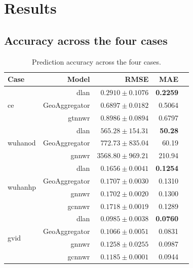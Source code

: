 \documentclass[]{interact}
\newcommand{\DLAN}{\gls{dlan}\xspace}
\newcommand{\GNNWR}{\gls{gnnwr}\xspace}
\newcommand{\GTNNWR}{\gls{gtnnwr}\xspace}
\newcommand{\GCNNWR}{\gls{gcnnwr}\xspace}
\newcommand{\GAgg}{GeoAggregator\xspace}
\newcommand{\COO}{\gls{ce}\xspace}
\newcommand{\WuhanOD}{\gls{wuhanod}\xspace}
\newcommand{\WuhanHP}{\gls{wuhanhp}\xspace}
\newcommand{\GVI}{\gls{gvid}\xspace}
\begin{document}
\section{Results}\label{sec:results}

\subsection{Accuracy across the four cases}

\begin{table}[tb]
  \centering\small
  \caption{Prediction accuracy across the four cases.}
  \label{tab:accuracy}
    \begin{tabular}{lrrrr}\toprule
    Case & Model   & RMSE                       & MAE             \\
    \midrule
    \multirow{3}{*}{\COO}
         & \DLAN   & $\mathbf{0.2910}\pm0.1076$ & \textbf{0.2259} \\
         & \GAgg   & $0.6897\pm0.0182$          & 0.5064          \\
         & \GTNNWR & $0.8986\pm0.0894$          & 0.6797          \\
    \midrule
    \multirow{3}{*}{\WuhanOD}
         & \DLAN   & $\mathbf{565.28}\pm154.31$ & \textbf{50.28}  \\
         & \GAgg   & $772.73\pm835.04$          & 60.19           \\
         & \GNNWR  & $3568.80\pm969.21$         & 210.94          \\
    \midrule
    \multirow{4}{*}{\WuhanHP}
         & \DLAN   & $\mathbf{0.1656}\pm0.0041$ & \textbf{0.1254} \\
         & \GAgg   & $0.1707\pm0.0030$          & 0.1310          \\
         & \GNNWR  & $0.1702\pm0.0020$          & 0.1300          \\
         & \GCNNWR & $0.1718\pm0.0019$          & 0.1289          \\
    \midrule
    \multirow{4}{*}{\GVI}
         & \DLAN   & $\mathbf{0.0985}\pm0.0038$ & \textbf{0.0760} \\
         & \GAgg   & $0.1066\pm0.0051$          & 0.0831          \\
         & \GNNWR  & $0.1258\pm0.0255$          & 0.0987          \\
         & \GCNNWR & $0.1185\pm0.0001$          & 0.0944          \\
    \bottomrule
  \end{tabular}
\end{table}
\end{document}
